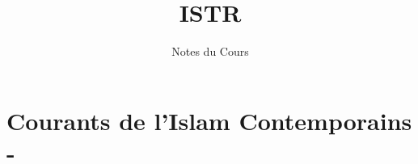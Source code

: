 \documentclass[oneside,10pt]{book} %
\title{ISTR}
\author{Notes du Cours}
\begin{document}


\maketitle



\setcounter{page}{1}
\begin{fullwidth}
\tableofcontents
\end{fullwidth}

\setcounter{page}{1}
 
\mainmatter


\part{Courants de l'Islam Contemporains - }







\backmatter
 
%
%
\printbibliography

\listoftheorems[ignoreall,show={Def}]
%
\end{document}

